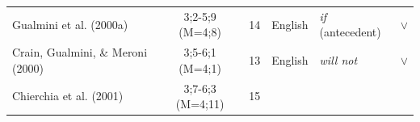 \documentclass[oneside]{report}
\theoremstyle{definition}
\theoremstyle{definition}
\theoremstyle{definition}
\theoremstyle{remark}
\begin{document}
\begin{longtable}[]{@{}lccclc@{}}
\begin{minipage}[t]{0.23\columnwidth}\raggedright\strut
Gualmini et al. (2000a)\strut
\end{minipage} & \begin{minipage}[t]{0.07\columnwidth}\centering\strut
3;2-5;9 (M=4;8)\strut
\end{minipage} & \begin{minipage}[t]{0.05\columnwidth}\centering\strut
14\strut
\end{minipage} & \begin{minipage}[t]{0.10\columnwidth}\centering\strut
English\strut
\end{minipage} & \begin{minipage}[t]{0.25\columnwidth}\raggedright\strut
\emph{if} (antecedent)\strut
\end{minipage} & \begin{minipage}[t]{0.13\columnwidth}\centering\strut
\(\lor\)\strut
\end{minipage}\tabularnewline
\begin{minipage}[t]{0.23\columnwidth}\raggedright\strut
Crain, Gualmini, \& Meroni (2000)\strut
\end{minipage} & \begin{minipage}[t]{0.07\columnwidth}\centering\strut
3;5-6;1 (M=4;1)\strut
\end{minipage} & \begin{minipage}[t]{0.05\columnwidth}\centering\strut
13\strut
\end{minipage} & \begin{minipage}[t]{0.10\columnwidth}\centering\strut
English\strut
\end{minipage} & \begin{minipage}[t]{0.25\columnwidth}\raggedright\strut
\emph{will not}\strut
\end{minipage} & \begin{minipage}[t]{0.13\columnwidth}\centering\strut
\(\lor\)\strut
\end{minipage}\tabularnewline
\begin{minipage}[t]{0.23\columnwidth}\raggedright\strut
Chierchia et al. (2001)\strut
\end{minipage} & \begin{minipage}[t]{0.07\columnwidth}\centering\strut
3;7-6;3 (M=4;11)\strut
\end{minipage} & \begin{minipage}[t]{0.05\columnwidth}\centering\strut
15\strut
\end{minipage} & \begin{minipage}[t]{0.10\columnwidth}\centering\strut

\end{minipage}
\end{longtable}
\end{document}
